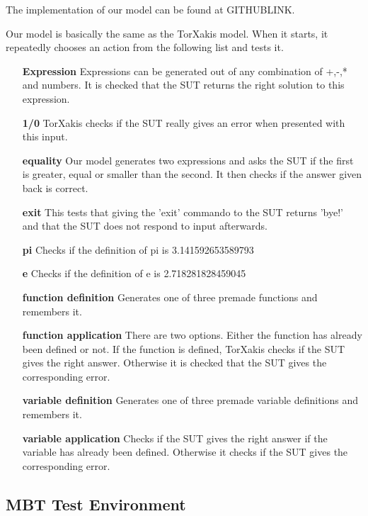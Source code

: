 \documentclass[11pt,a4paper]{article}
\begin{document}
The implementation of our model can be found at GITHUBLINK.

Our model is basically the same as the TorXakis model. When it starts, it repeatedly chooses an action from the following list and tests it.
\begin{itemize}
	\item[\textbf{Expression}] Expressions can be generated out of any combination of +,-,* and numbers. It is checked that the SUT returns the right solution to this expression.
	\item[\textbf{1/0}] TorXakis checks if the SUT really gives an error when presented with this input.
	\item[\textbf{equality}] Our model generates two expressions and asks the SUT if the first is greater, equal or smaller than the second. It then checks if the answer given back is correct.
	\item[\textbf{exit}] This tests that giving the 'exit' commando to the SUT returns 'bye!' and that the SUT does not respond to input afterwards.
	\item[\textbf{pi}] Checks if the definition of pi is 3.141592653589793
	\item[\textbf{e}] Checks if the definition of e is 2.718281828459045
	\item[\textbf{function definition}] Generates one of three premade functions and remembers it.
	\item[\textbf{function application}] There are two options. Either the function has already been defined or not. If the function is defined, TorXakis checks if the SUT gives the right answer. Otherwise it is checked that the SUT gives the corresponding error.
	\item[\textbf{variable definition}] Generates one of three premade variable definitions and remembers it.
	\item[\textbf{variable application}] Checks if the SUT gives the right answer if the variable has already been defined. Otherwise it checks if the SUT gives the corresponding error.
\end{itemize}

\subsection{MBT Test Environment}
\end{document}
